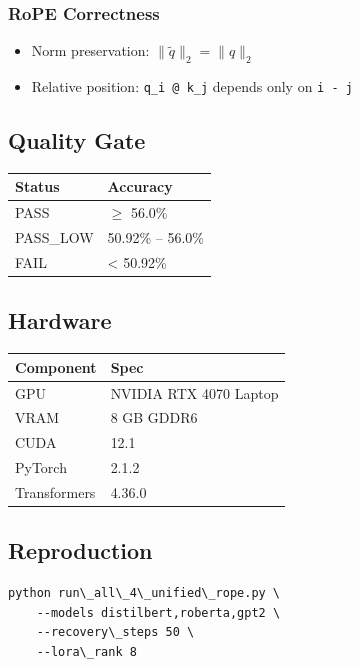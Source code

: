 \subsubsection{RoPE Correctness}
\begin{itemize}
\item Norm preservation: $\|\tilde{q}\|_2 = \|q\|_2$
\item Relative position: \texttt{q\_i @ k\_j} depends only on \texttt{i - j}

\end{itemize}
\subsection{Quality Gate}

\begin{table}[H]
\centering
\small
\begin{tabular}{ll}
\toprule
\textbf{Status} & \textbf{Accuracy} \\
\midrule
PASS & $\ge$ 56.0\% \\
PASS\_LOW & 50.92\% -- 56.0\% \\
FAIL & \textless{} 50.92\% \\
\bottomrule
\end{tabular}
\end{table}

\subsection{Hardware}

\begin{table}[H]
\centering
\small
\begin{tabular}{ll}
\toprule
\textbf{Component} & \textbf{Spec} \\
\midrule
GPU & NVIDIA RTX 4070 Laptop \\
VRAM & 8 GB GDDR6 \\
CUDA & 12.1 \\
PyTorch & 2.1.2 \\
Transformers & 4.36.0 \\
\bottomrule
\end{tabular}
\end{table}

\subsection{Reproduction}

\begin{lstlisting}
python run\_all\_4\_unified\_rope.py \
    --models distilbert,roberta,gpt2 \
    --recovery\_steps 50 \
    --lora\_rank 8
\end{lstlisting}

